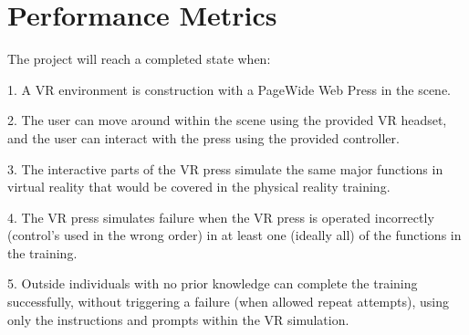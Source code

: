 \documentclass[onecolumn, draftclsnofoot,10pt, compsoc]{IEEEtran}
\begin{document}
\section{Performance Metrics}

The project will reach a completed state when:

1. A VR environment is construction with a PageWide Web Press in the scene. 

2. The user can move around within the scene using the provided VR headset, and the user can interact with the press using the provided controller. 

3. The interactive parts of the VR press simulate the same major functions in virtual reality that would be covered in the physical reality training.   

4. The VR press simulates failure when the VR press is operated incorrectly (control's used in the wrong order) in at least one (ideally all) of the functions in the training.

5. Outside individuals with no prior knowledge can complete the training successfully, without triggering a failure (when allowed repeat attempts), using only the instructions and prompts within the VR simulation. 
\end{document}
